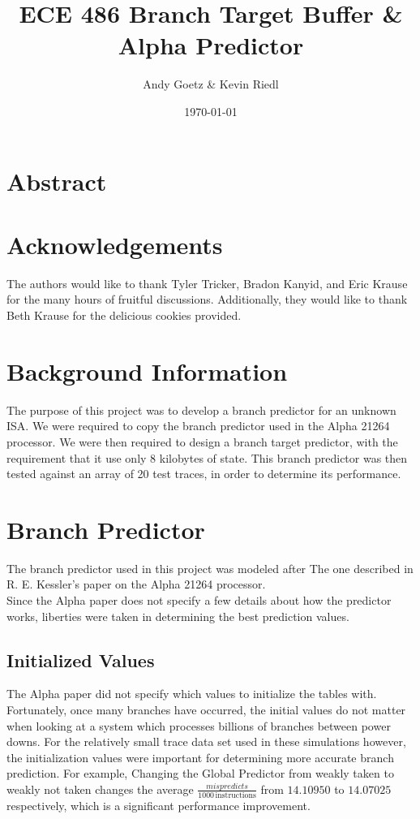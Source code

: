 \documentclass[twocolumn]{article}
\author{\LARGE Andy Goetz \& Kevin Riedl}
\date{\today}
\title{\Huge \textbf{ECE 486 Branch Target Buffer \& Alpha Predictor}}
\begin{document}
\maketitle

\section{Abstract}
\section{Acknowledgements}

The authors would like to thank Tyler Tricker, Bradon Kanyid, and Eric
Krause for the many hours of fruitful discussions. Additionally, they
would like to thank Beth Krause for the delicious cookies provided.

\section{Background Information}
The purpose of this project was to develop a branch predictor for an
unknown ISA. We were required to copy the branch predictor used in the
Alpha 21264 processor. We were then required to design a branch target
predictor, with the requirement that it use only 8 kilobytes of
state. This branch predictor was then tested against an array of 20
test traces, in order to determine its performance. 


\section{Branch Predictor}
The branch predictor used in this project was modeled after
The one described in R. E. Kessler's paper on the Alpha 
21264 processor.\\

Since the Alpha paper does not specify a few details about how the predictor
works, liberties were taken in determining the best prediction values. 

\subsection{Initialized Values}
The Alpha paper did not specify which values to initialize the tables with.
Fortunately, once many branches have occurred, the initial values do not matter
when looking at a system which processes billions of branches between power downs.
For the relatively small trace data set used in these simulations however,
the initialization values were important for determining more accurate branch prediction.
For example, Changing the Global Predictor from weakly taken to weakly not taken changes 
the average $\frac{mispredicts}{1000\,\text{instructions}}$ from $14.10950$ to $14.07025$
respectively, which is a significant performance improvement.
 
\end{document}
